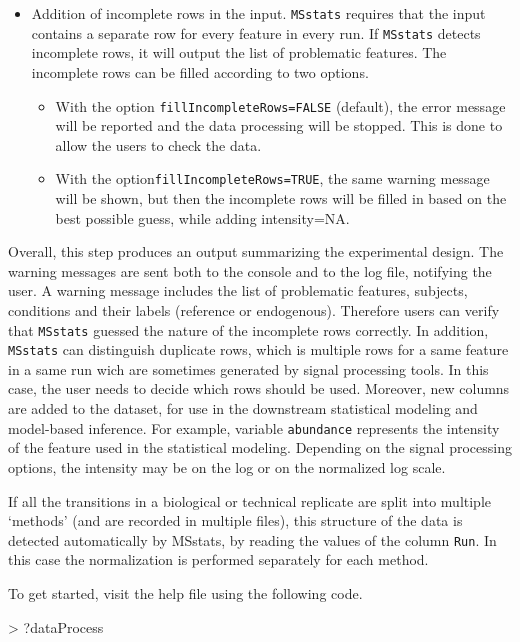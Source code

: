 \documentclass[11pt]{article}
\begin{document}
\begin{enumerate}
\begin{itemize}
\item Addition of incomplete rows in the input. {\tt MSstats} requires that the input contains a separate row for every feature in every run. If {\tt MSstats} detects incomplete rows, it will output the list of problematic features. The incomplete rows can be filled according to two options.
  \begin{itemize}
  \item With the option {\tt fillIncompleteRows=FALSE} (default), the error message will be reported and the data processing will be stopped. This is done to allow the users to check the data.
  \item With the option{\tt fillIncompleteRows=TRUE}, the same warning message will be shown, but then the incomplete rows will be filled in based on the best possible guess, while adding intensity=NA.
  \end{itemize}

\end{itemize}

Overall, this step produces an output summarizing the experimental design. The warning messages are sent both to the console and to the log file, notifying the user. A warning message includes the list of problematic features, subjects, conditions and their labels (reference or endogenous). Therefore users can verify that {\tt MSstats} guessed the nature of the incomplete rows correctly. In addition, {\tt MSstats} can distinguish duplicate rows, which is multiple rows for a same feature in a same run wich are sometimes generated by signal processing tools. In this case, the user needs to decide which rows should be used. Moreover, new columns are added to the dataset, for use in the downstream statistical modeling and model-based inference. For example, variable {\tt abundance} represents the intensity of the feature used in the statistical modeling. Depending on the signal processing options, the intensity may be on the log or on the normalized log scale.

If all the transitions in a biological or technical replicate are split into multiple `methods' (and are recorded in multiple files), this structure of the data is detected automatically by MSstats, by reading the values of the column {\tt Run}. In this case the normalization is performed separately for each method.

To get started, visit the help file using the following code.

\begin{small}
\begin{Schunk}
\begin{Sinput}
> ?dataProcess
\end{Sinput}
\end{Schunk}
\end{small}


\end{enumerate}
\end{document}
